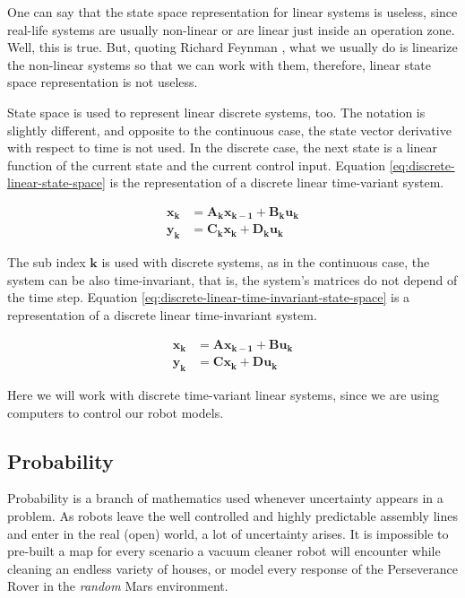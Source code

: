 \documentclass[12pt]{article}
\newcommand{\bvec}[1]{\mathbf{#1}} %
\newcommand{\mat}[1]{\mathbf{#1}}
\begin{document}
One can say that the state space representation for linear systems is useless, since real-life systems are usually non-linear or are linear just inside an operation zone. Well, this is true. But, quoting Richard Feynman , what we usually do is linearize the non-linear systems so that we can work with them, therefore, linear state space representation is not useless.

State space is used to represent linear discrete systems, too. The notation is slightly different, and opposite to the continuous case, the state vector derivative with respect to time is not used. In the discrete case, the next state is a linear function of the current state and the current control input. Equation \ref{eq:discrete-linear-state-space} is the representation of a discrete linear time-variant system.

\begin{equation}
    \begin{aligned}
        \bvec{x_{k}} &= \mat{A_k} \bvec{x_{k-1}} + \mat{B_k} \bvec{u_k} \\
        \bvec{y_k} &= \mat{C_k} \bvec{x_k} + \mat{D_k} \bvec{u_k}
    \end{aligned}
    \label{eq:discrete-linear-state-space}
\end{equation}

The sub index $\mathbf{k}$ is used with discrete systems, as in the continuous case, the system can be also time-invariant, that is, the system's matrices do not depend of the time step. Equation \ref{eq:discrete-linear-time-invariant-state-space} is a representation of a discrete linear time-invariant system.

\begin{equation}
    \begin{aligned}
        \bvec{x_{k}} &= \mat{A} \bvec{x_{k-1}} + \mat{B} \bvec{u_k} \\
        \bvec{y_k} &= \mat{C} \bvec{x_k} + \mat{D} \bvec{u_k}
    \end{aligned}
    \label{eq:discrete-linear-time-invariant-state-space}
\end{equation}

Here we will work with discrete time-variant linear systems, since we are using computers to control our robot models.

\subsection{Probability}
Probability is a branch of mathematics used whenever uncertainty appears in a problem. As robots leave the well controlled and highly predictable assembly lines and enter in the real (open) world, a lot of uncertainty arises. It is impossible to pre-built a map for every scenario a vacuum cleaner robot will encounter while cleaning an endless variety of houses, or model every response of the Perseverance Rover in the \textit{random} Mars environment.
\end{document}
